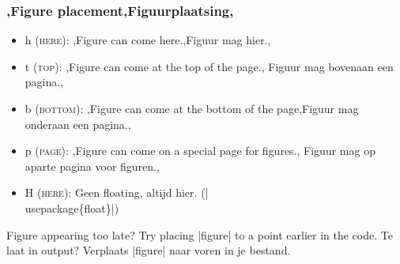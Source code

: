 
\begin{frame}
	\frametitle{\lang,Figure placement,Figuurplaatsing,}

	
	\begin{itemize}
		\item h \textsc{(here)}: \lang,Figure can come here.,Figuur mag hier.,
		\item t \textsc{(top)}: \lang,Figure can come at the top of the page.,%
			Figuur mag bovenaan een pagina.,
		\item b \textsc{(bottom)}: \lang,Figure can come at the bottom of the
			page,Figuur mag onderaan een pagina.,
		\item p \textsc{(page)}: \lang,Figure can come on a special page for figures.,%
			Figuur mag op aparte pagina voor figuren.,
		\item H \textsc{(here)}: 
		{Geen floating, altijd hier.} (\hll|\\usepackage\{float\}|)
	\end{itemize}

	\medskip
	\lang
	{Figure appearing too late? Try placing \hll|figure| to a point earlier in the code.}
	{Te laat in output? Verplaats \hll|figure| naar voren in je bestand.}

\end{frame}
